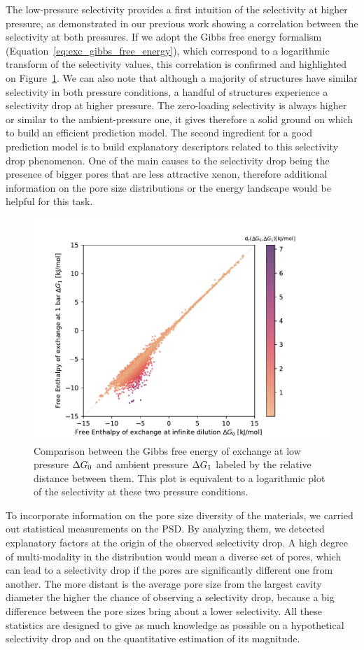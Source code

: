 \documentclass[main]{subfiles}
\begin{document}
The low-pressure selectivity provides a first intuition of the selectivity at higher pressure, as demonstrated in our previous work showing a correlation between the selectivity at both pressures.\autocite{Ren_2021} If we adopt the Gibbs free energy formalism (Equation~\ref{eq:exc_gibbs_free_energy}), which correspond to a logarithmic transform of the selectivity values, this correlation is confirmed and highlighted on Figure~\ref{fgr:problem}. We can also note that although a majority of structures have similar selectivity in both pressure conditions, a handful of structures experience a selectivity drop at higher pressure. The zero-loading selectivity is always higher or similar to the ambient-pressure one, it gives therefore a solid ground on which to build an efficient prediction model. The second ingredient for a good prediction model is to build explanatory descriptors related to this selectivity drop phenomenon. One of the main causes to the selectivity drop being the presence of bigger pores that are less attractive xenon, therefore additional information on the pore size distributions or the energy landscape would be helpful for this task.

\begin{figure}[ht]
\centering
  \includegraphics[width=0.5\linewidth]{figures/4-ml/main/Scatterplot_G1_G0.pdf}
  \caption{Comparison between the Gibbs free energy of exchange at low pressure $\Delta G_{\text{0}}$ and ambient pressure $\Delta G_{\text{1}}$ labeled by the relative distance between them. This plot is equivalent to a logarithmic plot of the selectivity at these two pressure conditions.}
  \label{fgr:problem}
\end{figure}

To incorporate information on the pore size diversity of the materials, we carried out statistical measurements on the PSD. By analyzing them, we detected explanatory factors at the origin of the observed selectivity drop. A high degree of multi-modality in the distribution would mean a diverse set of pores, which can lead to a selectivity drop if the pores are significantly different one from another. The more distant is the average pore size from the largest cavity diameter the higher the chance of observing a selectivity drop, because a big difference between the pore sizes bring about a lower selectivity. All these statistics are designed to give as much knowledge as possible on a hypothetical selectivity drop and on the quantitative estimation of its magnitude.
\end{document}
